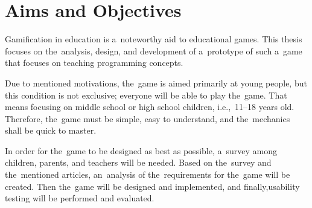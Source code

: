 \section{Aims and Objectives}

Gamification in education is a~noteworthy aid to educational games.
This thesis focuses on the~analysis, design, and development of a~prototype of such a~game
that focuses on teaching programming concepts.

Due to mentioned motivations, the~game is aimed primarily at young \mbox{people}, but this condition is not exclusive; everyone will be able to play the~game.
That means focusing on middle school or high school children, i.e.,~11--18 years old.
Therefore, the~game must be simple, easy to understand, and the~mechanics shall be quick to master.

In order for the~game to be designed as best as possible, a~survey among children, parents, and teachers will be needed.
Based on the~survey and the~mentioned articles, an~analysis of the~requirements for the~game will be created.
Then the~game will be designed and implemented, and finally,\linebreak{}usability testing will be performed and evaluated.
